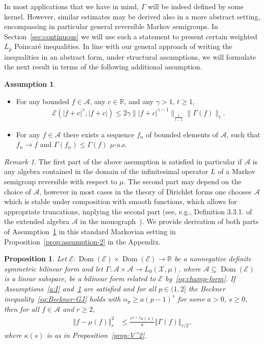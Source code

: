 \documentclass[a4paper]{amsart}
\newtheorem{proposition}[theorem]{Proposition} %
\theoremstyle{definition}
\newtheorem{assumption}{Assumption} %
\theoremstyle{remark}
\newtheorem{remark}[theorem]{Remark}
\numberwithin{equation}{section}
\newcommand*{\RR}{\mathbb{R}}
\newcommand{\calX}{\mathcal{X}}
\newcommand*{\calA}{\mathcal{A}}
\DeclareMathOperator{\Dom}{Dom} %
\newcommand*{\calE}{\mathcal{E}}
\newcommand*{\norm}[1]{\left\Vert #1 \right\Vert}
\begin{document}
In most applications that we have in mind, $\Gamma$ will be indeed defined by some kernel. However, similar estimates may be derived also in a more abstract setting, encompassing in particular general reversible Markov semigroups. In Section~\ref{sec:continuous} we will use such a statement to present certain weighted $L_p$ Poincar\'e inequalities. In line with our general approach of writing the inequalities in an abstract form, under structural assumptions, we will formulate the next result in terms of the following additional assumption.

\begin{assumption}\label{a:II}
\leavevmode
\begin{itemize}
\item For any bounded $f \in \calA$, any $c \in \RR$, and any $\gamma > 1$, $t \ge 1$,
\begin{align}\label{eq:assumption-2-1}
  \calE( |f+c|^\gamma, |f+c|) \le 2 \gamma \bigl\| |f+c|^{\gamma-1}\bigr\|_{\frac{t}{t-1}} \bigl\| \Gamma(f) \bigr\|_{t}.
\end{align}
\item For any $f \in \calA$ there exists a sequence $f_n$ of bounded elements of $\calA$, such that $f_n \to f$ and $\Gamma(f_n) \le \Gamma(f)$ $\mu$-a.s.
\end{itemize}
\end{assumption}

\begin{remark}
The first part of the above assumption is satisfied in particular if $\calA$ is any algebra contained in the domain of the infinitesimal operator $L$ of a Markov semigroup reversible with respect to $\mu$. The second part may depend on the choice of $\mathcal{A}$, however in most cases in the theory of Dirichlet forms one chooses $\calA$ which is stable under composition with smooth functions, which allows for appropriate truncations, implying the second part (see, e.g., Definition 3.3.1. of the extended algebra $\calA$ in the monograph~\cite{MR3155209}). We provide derivation of both parts of Assumption~\ref{a:II}  in this standard Markovian setting in Proposition~\ref{prop:assumption-2} in the Appendix.
\end{remark}

\begin{proposition}\label{prop:moments-abstract}
Let $\calE\colon \Dom(\calE)\times \Dom(\calE) \to \RR$ be a nonnegative definite symmetric bilinear form and let $\Gamma\colon \calA\times \calA \to L_0(\calX,\mu)$, where $\calA \subseteq \Dom(\calE)$ is a linear subspace, be a bilinear form related to $\calE$ by~\eqref{eq:champ-form}.
If Assumptions~\ref{a:I}  and~\ref{a:II} are satisfied and for all $p \in (1,2]$ the Beckner inequality~\eqref{eq:Beckner-GJ} holds with $\alpha_p \ge a(p-1)^s$ for some $a>0$, $s\ge 0$, then for all $f\in \mathcal{A}$ and $r\ge 2$,	
	\begin{align}\label{eq:moments-4}
		\norm{f-\mu(f)}_r^2 &\le \frac{r^{s+1}\kappa(s)}{a} \norm{\Gamma(f)}_{r/2},
	\end{align}
where $\kappa(s)$ is as in Proposition~\ref{prop:V^2}.
\end{proposition}
\end{document}
